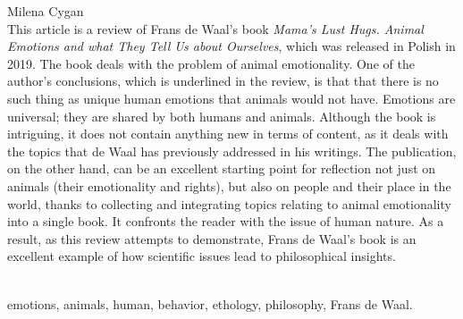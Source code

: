 \begin{newrevplenv}{Milena Cygan}
{}\\
{This article is a review of Frans de Waal's book \textit{Mama's Lust Hugs. Animal Emotions and what They Tell Us about Ourselves}, which was released in Polish in 2019. The book deals with the problem of animal emotionality. One of the author's conclusions, which is underlined in the review, is that that there is no such thing as unique human emotions that animals would not have. Emotions are universal; they are shared by both humans and animals. Although the book is intriguing, it does not contain anything new in terms of content, as it deals with the topics that de Waal has previously addressed in his writings. The publication, on the other hand, can be an excellent starting point for reflection not just on animals (their emotionality and rights), but also on people and their place in the world, thanks to collecting and integrating topics relating to animal emotionality into a single book. It confronts the reader with the issue of human nature. As a result, as this review  attempts to demonstrate, Frans de Waal's book is an excellent example of how scientific issues lead to philosophical insights.
}\par%
\vspace{2mm}%
{}\\%
{emotions, animals, human, behavior, ethology, philosophy, Frans de Waal.}%





\end{newrevplenv}
